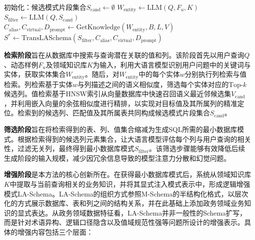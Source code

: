 \begin{algorithm}[htbp]
初始化：候选模式片段集合$S_{\text{cand}} \leftarrow \emptyset$\;
$W_{\text{entity}} \leftarrow \text{LLM}(Q, F_u, K)$
$S_{\text{filter}} \leftarrow \text{LLM}(Q, S_{\text{cand}})$
$C_{\text{alias}}, C_{\text{virtual}}, D_{\text{prompt}} \leftarrow \text{GetKnowledge}(W_{\text{entity}}, B, L, V)$\;
$S^{*} \leftarrow \text{TransLASchema}(S_{\text{filter}}, C_{\text{alias}}, C_{\text{virtual}}, D_{\text{prompt}})$
\caption{基于逻辑增强的模式链接算法}
\label{alg:schema_linking}
\end{algorithm}

\textbf{检索阶段}旨在从数据库中搜索与查询潜在关联的值和列。该阶段首先以用户查询$Q$、动态样例$F_u$及领域知识库$K$为输入，利用大语言模型识别用户问题中的关键词与实体，获取实体集合$W_{\text{entity}}$。随后，对$W_{\text{entity}}$中的每个实体$w$分别执行列检索与值检索。列检索基于实体$w$与列描述之间的语义相似度，筛选每个实体对应的$\text{Top-}k$候选列。值检索基于HNSW索引从向量数据库中快速召回语义最近邻候选集$V_{\text{cand}}$，并利用嵌入向量的余弦相似度进行精排，以实现对目标值及其所属列的精准定位。检索到的候选列、匹配值及其所属表共同构成候选模式片段集合$S_{\text{cand}}$。

\textbf{筛选阶段}旨在将检索得到的表、列、值集合缩减为生成SQL所需的最小数据库模式。根据检索得到的候选列元素集合，让大语言模型评估每个列与用户查询的相关性，过滤无关列，最终得到最小数据库模式$S_{\text{filter}}$。该筛选步骤能够有效降低后续生成阶段的输入规模，减少因冗余信息导致的模型注意力分散和幻觉问题。

\textbf{增强阶段}是本方法的核心创新所在。在获得最小数据库模式后，系统从领域知识库$K$中提取与当前查询相关的业务知识，并将其显式注入模式表示中，形成逻辑增强模式LA-Schema。LA-Schema的组织方式参照M-Schema\cite{gao2024xiyan}的半结构化格式，以层次化的方式展示数据库、表和列之间的结构关系，并在此基础上添加政务领域业务知识的显式表达。从政务领域数据特征看，LA-Schema并非一般性的Schema扩写，而是针对术语异构、逻辑口径隐含以及值域规范性强等问题所设计的增强表示。具体的增强内容包括三个层面：


